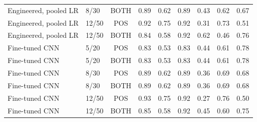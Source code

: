 \begin{table}[!htbp]
{\begin{tabular}{llccccccc}
Engineered, pooled LR & 8/30 & BOTH & 0.89 & 0.62 & 0.89 & 0.43 & 0.62 & 0.67 \\
Engineered, pooled LR & 12/50 & POS & 0.92 & 0.75 & 0.92 & 0.31 & 0.73 & 0.51 \\
Engineered, pooled LR & 12/50 & BOTH & 0.84 & 0.58 & 0.92 & 0.62 & 0.46 & 0.76 \\
Fine-tuned CNN & 5/20 & POS & 0.83 & 0.53 & 0.83 & 0.44 & 0.61 & 0.78 \\
Fine-tuned CNN & 5/20 & BOTH & 0.83 & 0.53 & 0.83 & 0.44 & 0.61 & 0.78 \\
Fine-tuned CNN & 8/30 & POS & 0.89 & 0.62 & 0.89 & 0.36 & 0.69 & 0.68 \\
Fine-tuned CNN & 8/30 & BOTH & 0.89 & 0.62 & 0.89 & 0.36 & 0.69 & 0.68 \\
Fine-tuned CNN & 12/50 & POS & 0.93 & 0.75 & 0.92 & 0.27 & 0.76 & 0.50 \\
Fine-tuned CNN & 12/50 & BOTH & 0.85 & 0.58 & 0.92 & 0.45 & 0.60 & 0.75 \\
\bottomrule
\end{tabular}}
\end{table}